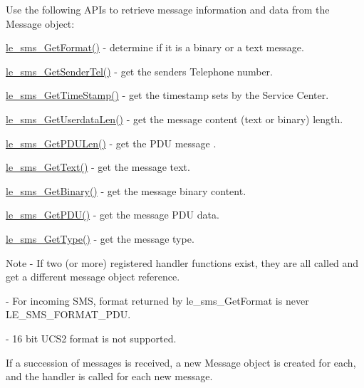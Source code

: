 Use the following A\+P\+Is to retrieve message information and data from the Message object\+:
\begin{DoxyItemize}
\item \hyperlink{le__sms__interface_8h_a5c2b8ce7043b4732c7b0ede7c5d7118c}{le\+\_\+sms\+\_\+\+Get\+Format()} -\/ determine if it is a binary or a text message.
\item \hyperlink{le__sms__interface_8h_a68bfd509a8a3fd4ae39bde7ac5c32d8d}{le\+\_\+sms\+\_\+\+Get\+Sender\+Tel()} -\/ get the sender\textquotesingle{}s Telephone number.
\item \hyperlink{le__sms__interface_8h_aca83e53998bd7105e14011af41ba6499}{le\+\_\+sms\+\_\+\+Get\+Time\+Stamp()} -\/ get the timestamp sets by the Service Center.
\item \hyperlink{le__sms__interface_8h_a6165464dd3502b3c76b79b32206ba10f}{le\+\_\+sms\+\_\+\+Get\+Userdata\+Len()} -\/ get the message content (text or binary) length.
\item \hyperlink{le__sms__interface_8h_abb89b302e564f3d55d604bb0c0dda022}{le\+\_\+sms\+\_\+\+Get\+P\+D\+U\+Len()} -\/ get the P\+D\+U message .
\item \hyperlink{le__sms__interface_8h_ac598dec158aed1e9fa134daf22c704db}{le\+\_\+sms\+\_\+\+Get\+Text()} -\/ get the message text.
\item \hyperlink{le__sms__interface_8h_a0de50069a9df99adac983385106d9c09}{le\+\_\+sms\+\_\+\+Get\+Binary()} -\/ get the message binary content.
\item \hyperlink{le__sms__interface_8h_ae4b284d427ab7ec637056a6208fdd89e}{le\+\_\+sms\+\_\+\+Get\+P\+D\+U()} -\/ get the message P\+D\+U data.
\item \hyperlink{le__sms__interface_8h_a2a63c6b5179025a80fb86c7f188e1eb7}{le\+\_\+sms\+\_\+\+Get\+Type()} -\/ get the message type.
\end{DoxyItemize}

\begin{DoxyNote}{Note}
-\/ If two (or more) registered handler functions exist, they are all called and get a different message object reference.

-\/ For incoming S\+M\+S, format returned by le\+\_\+sms\+\_\+\+Get\+Format is never L\+E\+\_\+\+S\+M\+S\+\_\+\+F\+O\+R\+M\+A\+T\+\_\+\+P\+D\+U.

-\/ 16 bit U\+C\+S2 format is not supported.
\end{DoxyNote}
If a succession of messages is received, a new Message object is created for each, and the handler is called for each new message.

